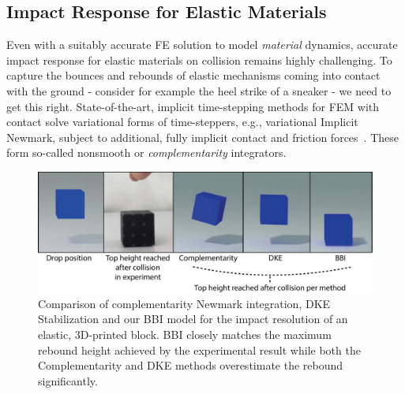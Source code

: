 \subsection{Impact Response for Elastic Materials}
Even with a suitably accurate FE solution to model \emph{material} dynamics, accurate impact response for elastic materials on collision remains highly challenging.  To capture the bounces and rebounds of elastic mechanisms coming into contact with the ground - consider for example the heel strike of a sneaker - we need to get this right. State-of-the-art, implicit time-stepping methods for FEM with contact solve variational forms of time-steppers, e.g., variational Implicit Newmark, subject to additional, fully implicit contact and friction forces~\cite{Kane:1999kr,Pandolfi:2002ik}. 
These form so-called nonsmooth or \emph{complementarity} integrators. 


\begin{figure}
	\centering
	\includegraphics[width=0.8\columnwidth]{figs/Figure_2_BBI}	
	\caption{Comparison of complementarity Newmark integration, DKE Stabilization and our BBI model for the impact resolution of an elastic, 3D-printed block. BBI closely matches the maximum rebound height achieved by the experimental result while both the Complementarity and DKE methods overestimate the rebound significantly.}
	\label{fig:BBI_block_compare}
\end{figure}


